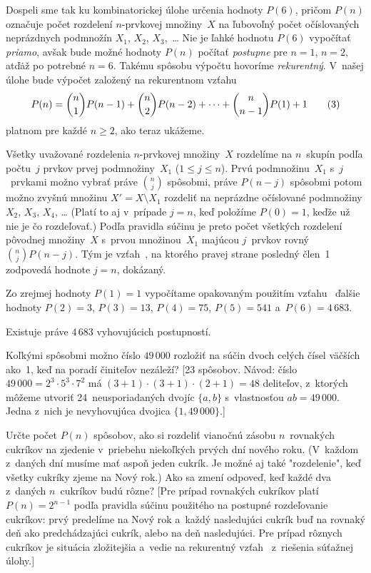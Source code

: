 {Dospeli sme tak ku kombinatorickej úlohe určenia hodnoty $P(6)$,
pričom $P(n)$ označuje
počet rozdelení $n$-prvkovej množiny~$X$
na ľubovoľný počet očíslovaných neprázdnych podmnožín
$X_1$, $X_2$, $X_3$,~\dots{} Nie je ľahké hodnotu $P(6)$
vypočítať {\it priamo}, avšak bude možné hodnoty $P(n)$ počítať
{\it postupne\/} pre $n=1$, $n=2$, atď\. až po potrebné $n=6$.
Takému spôsobu výpočtu hovoríme {\it rekurentný}. V~našej úlohe
bude výpočet založený na rekurentnom vzťahu
$$
P(n)=\binom{n}{1}P(n-1)+\binom{n}{2}P(n-2)+\dots+
\binom{n}{n-1}P(1)+1
\tag3
$$
platnom pre každé $n\ge2$, ako teraz ukážeme.

Všetky uvažované rozdelenia $n$-prvkovej množiny~$X$
rozdelíme na $n$~skupín podľa
počtu~$j$ prvkov prvej podmnožiny~$X_1$ ($1\le j\le n$).
Prvú podmnožinu~$X_1$ s~$j$~prvkami možno vybrať
práve $\binom{n}{j}$ spôsobmi, práve $P(n-j)$ spôsobmi potom možno
zvyšnú množinu $X'=X\setminus X_1$ rozdeliť na neprázdne
očíslované podmnožiny $X_2$, $X_3$, $X_4$, \dots{}
(Platí to aj v~prípade $j=n$, keď položíme $P(0)=1$, keďže už
nie je čo rozdeľovať.) Podľa pravidla súčinu je preto
počet všetkých rozdelení pôvodnej množiny~$X$ s~prvou množinou~$X_1$
majúcou $j$~prvkov rovný $\binom{n}{j}P(n-j)$. Tým je vzťah~,
na ktorého pravej strane posledný člen~1 zodpovedá hodnote
$j=n$, dokázaný.

Zo zrejmej hodnoty $P(1)=1$ vypočítame opakovaným použitím vzťahu~
ďalšie hodnoty
$P(2)=3$, $P(3)=13$, $P(4)=75$, $P(5)=541$ a~$P(6)=4\,683$.

\zaver
Existuje práve $4\,683$ vyhovujúcich postupností.


Koľkými spôsobmi možno číslo $49\,000$ rozložiť na súčin dvoch
celých čísel väčších ako~1, keď na poradí činiteľov nezáleží?
[23 spôsobov. Návod: číslo $49\,000=2^3\cdot5^3\cdot7^2$
má $(3+1)\cdot(3+1)\cdot(2+1)=48$ deliteľov, z~ktorých môžeme
utvoriť 24~neusporiadaných dvojíc $\{a,b\}$ s~vlastnosťou
$ab=49\,000$. Jedna z~nich je nevyhovujúca dvojica $\{1,49\,000\}$.]

Určte počet $P(n)$ spôsobov, ako si rozdeliť vianočnú zásobu
$n$~rovnakých cukríkov na zjedenie v~priebehu niekoľkých prvých
dní nového roku.
(V~každom z~daných dní musíme mať aspoň jeden cukrík.
Je možné aj také "rozdelenie", keď
všetky cukríky zjeme na Nový rok.) Ako sa zmení odpoveď,
keď každé dva z~daných
$n$~cukríkov budú rôzne? [Pre prípad rovnakých cukríkov platí
$P(n)=2^{n-1}$ podľa pravidla súčinu použitého na postupné
rozdeľovanie cukríkov: prvý predelíme na Nový rok
a~každý nasledujúci cukrík buď na rovnaký deň
ako predchádzajúci cukrík, alebo na deň nasledujúci. Pre prípad
rôznych cukríkov je situácia zložitejšia a~vedie na rekurentný
vzťah~ z~riešenia súťažnej úlohy.]

}
